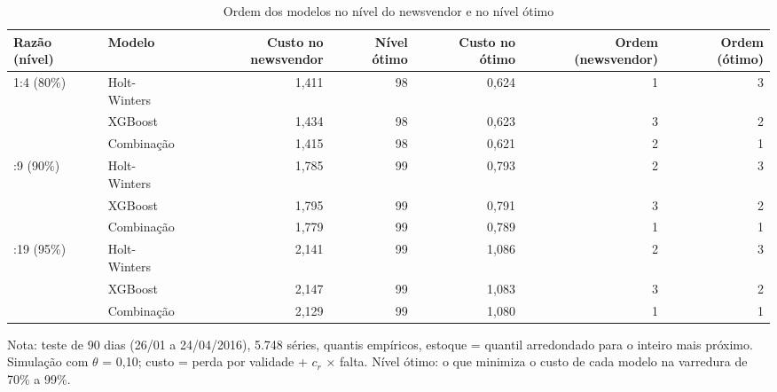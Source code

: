 \begin{table}[htbp]
\centering
\small
\caption{Ordem dos modelos no nível do newsvendor e no nível ótimo}
\label{tab:mec_nivel_otimo}
\begin{tabular}{llrrrrr}
\toprule
Razão (nível) & Modelo & Custo no newsvendor & Nível ótimo & Custo no ótimo & Ordem (newsvendor) & Ordem (ótimo) \\
\midrule
1:4 (80\%) & Holt-Winters & 1,411 & 98 & 0,624 & 1 & 3 \\
 & XGBoost & 1,434 & 98 & 0,623 & 3 & 2 \\
 & Combinação & 1,415 & 98 & 0,621 & 2 & 1 \\
\addlinespace
1:9 (90\%) & Holt-Winters & 1,785 & 99 & 0,793 & 2 & 3 \\
 & XGBoost & 1,795 & 99 & 0,791 & 3 & 2 \\
 & Combinação & 1,779 & 99 & 0,789 & 1 & 1 \\
\addlinespace
1:19 (95\%) & Holt-Winters & 2,141 & 99 & 1,086 & 2 & 3 \\
 & XGBoost & 2,147 & 99 & 1,083 & 3 & 2 \\
 & Combinação & 2,129 & 99 & 1,080 & 1 & 1 \\
\bottomrule
\end{tabular}
\par\smallskip
{\footnotesize Nota: teste de 90 dias (26/01 a 24/04/2016), 5.748 séries, quantis empíricos, estoque = quantil arredondado para o inteiro mais próximo. Simulação com $\theta$ = 0,10; custo = perda por validade + $c_r$ × falta. Nível ótimo: o que minimiza o custo de cada modelo na varredura de 70\% a 99\%.}
\end{table}
